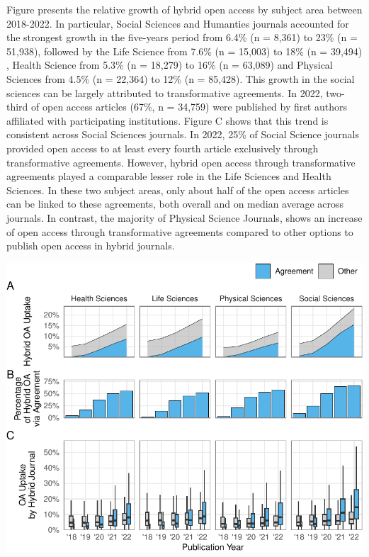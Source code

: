 \documentclass[a4paper,man,floatsintext,longtable,noextraspace,12pt]{apa6}
\begin{document}
Figure presents the relative growth of hybrid open access by subject
area between 2018-2022. In particular, Social Sciences and Humanties
journals accounted for the strongest growth in the five-years period
from 6.4\% (n = 8,361) to 23\% (n = 51,938), followed by the Life
Science from 7.6\% (n = 15,003) to 18\% (n = 39,494) , Health Science
from 5.3\% (n = 18,279) to 16\% (n = 63,089) and Physical Sciences from
4.5\% (n = 22,364) to 12\% (n = 85,428). This growth in the social
sciences can be largely attributed to transformative agreements. In
2022, two-third of open access articles (67\%, n = 34,759) were
published by first authors affiliated with participating institutions.
Figure C shows that this trend is consistent across Social Sciences
journals. In 2022, 25\% of Social Science journals provided open access
to at least every fourth article exclusively through transformative
agreements. However, hybrid open access through transformative
agreements played a comparable lesser role in the Life Sciences and
Health Sciences. In these two subject areas, only about half of the open
access articles can be linked to these agreements, both overall and on
median average across journals. In contrast, the majority of Physical
Science Journals, shows an increase of open access through
transformative agreements compared to other options to publish open
access in hybrid journals.

\begin{center}\includegraphics[width=0.99\linewidth]{fig/subject_panel-1} \end{center}
\end{document}
